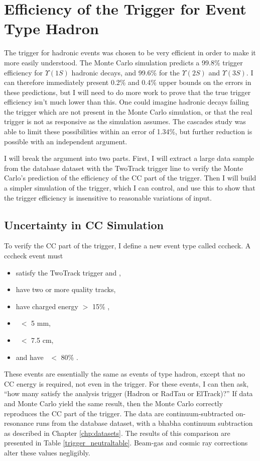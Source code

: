 \section{Efficiency of the Trigger for Event Type Hadron}

The trigger for hadronic events was chosen to be very efficient in
order to make it more easily understood.  The Monte Carlo simulation
predicts a 99.8\% trigger efficiency for $\Upsilon(1S)$ hadronic
decays, and 99.6\% for the $\Upsilon(2S)$ and $\Upsilon(3S)$.  I can
therefore immediately present 0.2\% and 0.4\% upper bounds on the
errors in these predictions, but I will need to do more work to prove
that the true trigger efficiency isn't much lower than this.  One
could imagine hadronic decays failing the trigger which are not
present in the Monte Carlo simulation, or that the real trigger is not
as responsive as the simulation assumes.  The cascades study was able
to limit these possibilities within an error of 1.34\%, but further
reduction is possible with an independent argument.

I will break the argument into two parts.  First, I will extract a
large data sample from the database dataset with the TwoTrack trigger
line to verify the Monte Carlo's prediction of the efficiency of the
CC part of the trigger.  Then I will build a simpler simulation of the
trigger, which I can control, and use this to show that the trigger
efficiency is insensitive to reasonable variations of input.

\subsection{Uncertainty in CC Simulation}

To verify the CC part of the trigger, I define a new event type called
cccheck.  A cccheck event must
\begin{itemize}
  \item satisfy the TwoTrack trigger and \lfourdec,
  \item have two or more quality tracks,
  \item have charged energy $>$ 15\% \ecom,
  \item \dxy\ $<$ 5 mm,
  \item \dz\ $<$ 7.5 cm,
  \item and have \pone\ $<$ 80\% \ebeam.
\end{itemize}
These events are essentially the same as events of type hadron, except
that no CC energy is required, not even in the trigger.  For these
events, I can then ask, ``how many satisfy the analysis trigger
(Hadron or RadTau or ElTrack)?''  If data and Monte Carlo yield the
same result, then the Monte Carlo correctly reproduces the CC part of
the trigger.  The data are continuum-subtracted on-resonance runs from
the database dataset, with a bhabha continuum subtraction as described
in Chapter \ref{chp:datasets}.  The results of this comparison are
presented in Table \ref{trigger_neutraltable}.  Beam-gas and cosmic
ray corrections alter these values negligibly.

